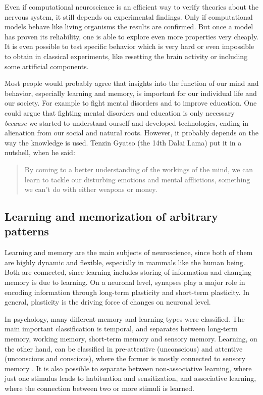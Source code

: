 Even if computational neuroscience is an efficient way to verify theories about the nervous system, it still depends on experimental findings. Only if computational models behave like living organisms the results are confirmed. But once a model has proven its reliability, one is able to explore even more properties very cheaply. It is even possible to test specific behavior which is very hard or even impossible to obtain in classical experiments, like resetting the brain activity or including some artificial components.

Most people would probably agree that insights into the function of our mind and behavior, especially learning and memory, is important for our individual life and our society. For example to fight mental disorders and to improve education. One could argue that fighting mental disorders and education is only necessary \emph{because} we started to understand ourself and developed technologies, ending in alienation from our social and natural roots. However, it probably depends on the way the knowledge is used. Tenzin Gyatso (the 14th Dalai Lama) put it in a nutshell, when he said:

\begin{quote}
By coming to a better understanding of the workings of the mind, we can learn to tackle our disturbing emotions and mental afflictions, something we can't do with either weapons or money.
\end{quote}

\subsection{Learning and memorization of arbitrary patterns}

Learning and memory are the main subjects of neuroscience, since both of them are highly dynamic and flexible, especially in mammals like the human being. Both are connected, since learning includes storing of information and changing memory is due to learning. On a neuronal level, synapses play a major role in encoding information through long-term plasticity and short-term plasticity. In general, plasticity is the driving force of changes on neuronal level.

In psychology, many different memory and learning types were classified. The main important classification is temporal, and separates between long-term memory, working memory, short-term memory and sensory memory. Learning, on the other hand, can be classified in pre-attentive (unconscious) and attentive (unconscious and conscious), where the former is mostly connected to sensory memory \parencite{schroger1997detection}. It is also possible to separate between non-associative learning, where just one stimulus leads to habituation and sensitization, and associative learning, where the connection between two or more stimuli is learned.

